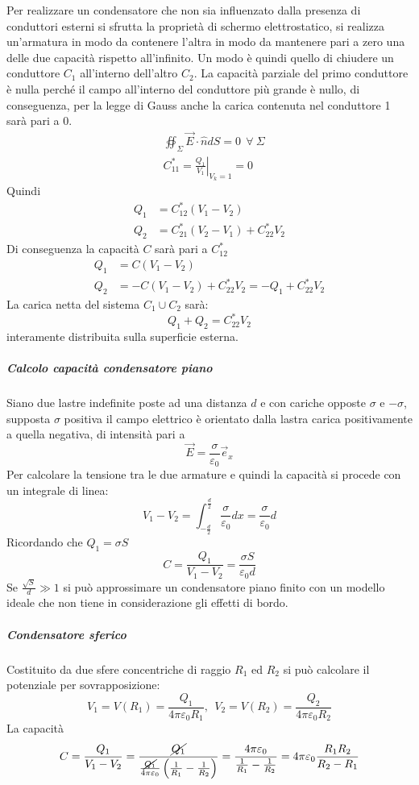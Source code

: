 Per realizzare un condensatore che non sia influenzato dalla presenza di conduttori esterni
si sfrutta la proprietà di schermo elettrostatico, si realizza un'armatura in modo da contenere
l'altra in modo da mantenere pari a zero una delle due capacità rispetto all'infinito.
Un modo è quindi quello di chiudere un conduttore $C_1$ all'interno dell'altro $C_2$.
La capacità parziale del primo conduttore è nulla perché il campo all'interno del conduttore
più grande è nullo, di conseguenza, per la legge di Gauss anche la carica contenuta nel conduttore
1 sarà pari a 0.
$$\begin{aligned}
& \oiint_{\Sigma}\vec{E}\cdot\hat{n}dS = 0\ \ \forall \ \Sigma\\
&C_{11}^* = \left.\frac{Q_1}{V_1}\right|_{V_k = 1} = 0
\end{aligned}
$$
Quindi 
$$
\begin{aligned}
Q_1 &= C_{12}^*(V_1-V_2) \\
Q_2 &= C_{21}^*(V_2-V_1) + C_{22}^*V_2
\end{aligned}
$$
Di conseguenza la capacità $C$ sarà pari a $C_{12}^*$
$$
\begin{aligned}
Q_1 &= C(V_1-V_2) \\
Q_2 &= -C(V_1-V_2) + C_{22}^*V_2 = -Q_1 + C_{22}^*V_2
\end{aligned}
$$
La carica netta del sistema $C_1 \cup C_2$ sarà:
$$
Q_1+Q_2 = C_{22}^*V_2
$$
interamente distribuita sulla superficie esterna.

\subparagraph{Calcolo capacità condensatore piano}
Siano due lastre indefinite poste ad una distanza $d$ e con cariche opposte
$\sigma$ e $-\sigma$, supposta $\sigma$ positiva il campo elettrico è orientato dalla
lastra carica positivamente a quella negativa, di intensità pari a 
$$
\vec{E} = \frac{\sigma}{\varepsilon_0} \vec{e}_x
$$
Per calcolare la tensione tra le due armature e quindi la capacità si procede con un integrale di 
linea:
$$
V_1-V_2 = \int_{-\frac{d}{2}}^{\frac{d}{2}} \frac{\sigma}{\varepsilon_0} dx = \frac{\sigma}{\varepsilon_0} d
$$
Ricordando che $Q_1 = \sigma S$ 
$$
C = \frac{Q_1}{V_1-V_2} = \frac{\sigma S}{\varepsilon_0 d}
$$
Se $\frac{\sqrt{S}}{d} \gg 1 $ si può approssimare un condensatore piano finito con un modello
ideale che non tiene in considerazione gli effetti di bordo.

\subparagraph{Condensatore sferico}
Costituito da due sfere concentriche di raggio $R_1$ ed $R_2$
si può calcolare il potenziale per sovrapposizione:
$$
V_1 = V(R_1) = \frac{Q_1}{4\pi \varepsilon_0 R_1},\ \ V_2 = V(R_2) = \frac{Q_2}{4 \pi \varepsilon_0 R_2}
$$
La capacità
$$
C = \frac{Q_1}{V_1 - V_2} = \frac{\cancel{Q_1}}{\frac{\cancel{Q_1}}{4 \pi \varepsilon_0}\left(\frac{1}{R_1}-\frac{1}{R_2}\right)} = \frac{4 \pi \varepsilon_0}{\frac{1}{R_1}-\frac{1}{R_2}} = 4 \pi \varepsilon_0 \frac{R_1 R_2}{R_2 - R_1}
$$

